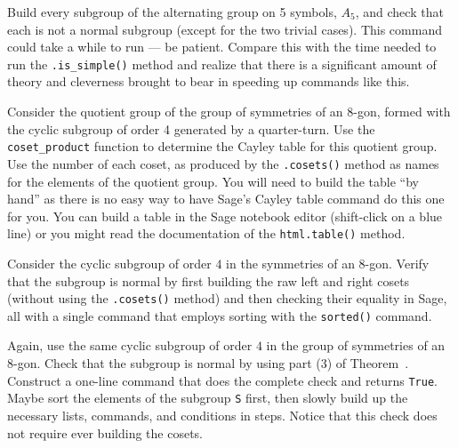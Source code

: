 \begin{sageverbatim}\end{sageverbatim}
%
%
Build every subgroup of the alternating group on 5 symbols, $A_5$, and check that each is not a normal subgroup (except for the two trivial cases).  This command could take a while to run --- be patient.  Compare this with the time needed to run the \verb?.is_simple()? method and realize that there is a significant amount of theory and cleverness brought to bear in speeding up commands like this.
\begin{sageverbatim}\end{sageverbatim}
%
%
Consider the quotient group of the group of symmetries of an 8-gon, formed with the cyclic subgroup of order 4 generated by a quarter-turn.  Use the \verb?coset_product? function to determine the Cayley table for this quotient group.  Use the number of each coset, as produced by the \verb?.cosets()? method as names for the elements of the quotient group.  You will need to build the table ``by hand'' as there is no easy way to have Sage's Cayley table command do this one for you.  You can build a table in the Sage notebook editor (shift-click on a blue line) or you might read the documentation of the \verb?html.table()? method.
\begin{sageverbatim}\end{sageverbatim}
%
%
Consider  the cyclic subgroup of order $4$ in the symmetries of an 8-gon.  Verify that the subgroup is normal by first building the raw left and right cosets (without using the \verb?.cosets()? method) and then checking their equality in Sage, all with a single command that employs sorting with the \verb?sorted()? command.
\begin{sageverbatim}\end{sageverbatim}
%
%
Again, use the same cyclic subgroup of order $4$ in the group of symmetries of an 8-gon.  Check that the subgroup is normal by using part (3) of Theorem~.  Construct a one-line command that does the complete check and returns \verb?True?.  Maybe sort the elements of the subgroup \verb?S? first, then slowly build up the necessary lists, commands, and conditions in steps.  Notice that this check does not require ever building the cosets.
